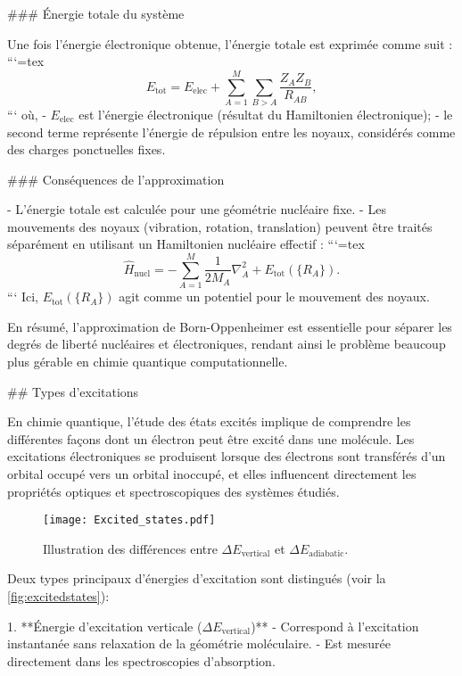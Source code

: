 \documentclass[12pt,a4paper]{report}
\numberwithin{equation}{section}
\numberwithin{figure}{section}
\numberwithin{table}{section}
\begin{document}
\begin{markdown}
### Énergie totale du système

Une fois l'énergie électronique obtenue, l'énergie totale est exprimée comme suit :
```{=tex}
\begin{equation}
E_{\text{tot}} = E_{\text{elec}} + \sum_{A=1}^M \sum_{B>A} \frac{Z_A Z_B}{R_{AB}},
\end{equation}
```
où,
- $E_{\text{elec}}$ est l'énergie électronique (résultat du Hamiltonien électronique);
- le second terme représente l'énergie de répulsion entre les noyaux, considérés comme des charges ponctuelles fixes.

### Conséquences de l'approximation

- L'énergie totale est calculée pour une géométrie nucléaire fixe.
- Les mouvements des noyaux (vibration, rotation, translation) peuvent être traités séparément en utilisant un Hamiltonien nucléaire effectif :
```{=tex}
\begin{equation}
\hat{H}_{\text{nucl}} = -\sum_{A=1}^M \frac{1}{2M_A} \nabla_A^2 + E_{\text{tot}}(\{R_A\}) .
\end{equation}
```
Ici, $E_{\text{tot}}(\{R_A\})$ agit comme un potentiel pour le mouvement des noyaux.

En résumé, l'approximation de Born-Oppenheimer est essentielle pour séparer les degrés de liberté nucléaires et électroniques, rendant ainsi le problème beaucoup plus gérable en chimie quantique computationnelle.


## Types d'excitations

En chimie quantique, l'étude des états excités implique de comprendre les différentes façons dont un électron peut être excité dans une molécule. Les excitations électroniques se produisent lorsque des électrons sont transférés d'un orbital occupé vers un orbital inoccupé, et elles influencent directement les propriétés optiques et spectroscopiques des systèmes étudiés.

\begin{figure}[htpb]
\centering
\texttt{[image: Excited\_states.pdf]}
\caption{Illustration des différences entre $\Delta E_{\text{vertical}}$ et $\Delta E_{\text{adiabatic}}$.}
\label{fig:excitedstates}
\end{figure}

Deux types principaux d'énergies d'excitation sont distingués (voir la \autoref{fig:excitedstates}):

1. **Énergie d'excitation verticale ($ \Delta E_{\text{vertical}} $)**
   - Correspond à l'excitation instantanée sans relaxation de la géométrie moléculaire.
   - Est mesurée directement dans les spectroscopies d'absorption.


\end{markdown}
\end{document}
